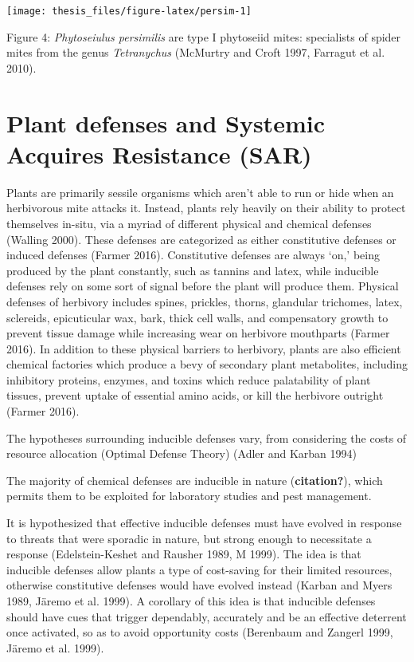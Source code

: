\documentclass[12pt,final,CPage]{ufthesis}
\begin{document}
{  \begin{center}\texttt{[image: thesis\_files/figure-latex/persim-1]} \end{center}

  Figure 4: \emph{Phytoseiulus persimilis} are type I phytoseiid mites: specialists of spider mites from the genus \emph{Tetranychus} (McMurtry and Croft 1997, Farragut et al. 2010).

  \hypertarget{sar-litrev}{%
  \section{Plant defenses and Systemic Acquires Resistance (SAR)}\label{sar-litrev}}

  Plants are primarily sessile organisms which aren't able to run or hide when an herbivorous mite attacks it. Instead, plants rely heavily on their ability to protect themselves in-situ, via a myriad of different physical and chemical defenses (Walling 2000). These defenses are categorized as either constitutive defenses or induced defenses (Farmer 2016). Constitutive defenses are always `on,' being produced by the plant constantly, such as tannins and latex, while inducible defenses rely on some sort of signal before the plant will produce them. Physical defenses of herbivory includes spines, prickles, thorns, glandular trichomes, latex, sclereids, epicuticular wax, bark, thick cell walls, and compensatory growth to prevent tissue damage while increasing wear on herbivore mouthparts (Farmer 2016). In addition to these physical barriers to herbivory, plants are also efficient chemical factories which produce a bevy of secondary plant metabolites, including inhibitory proteins, enzymes, and toxins which reduce palatability of plant tissues, prevent uptake of essential amino acids, or kill the herbivore outright (Farmer 2016).

  The hypotheses surrounding inducible defenses vary, from considering the costs of resource allocation (Optimal Defense Theory) (Adler and Karban 1994)

  The majority of chemical defenses are inducible in nature (\textbf{citation?}), which permits them to be exploited for laboratory studies and pest management.

  It is hypothesized that effective inducible defenses must have evolved in response to threats that were sporadic in nature, but strong enough to necessitate a response (Edelstein-Keshet and Rausher 1989, M 1999). The idea is that inducible defenses allow plants a type of cost-saving for their limited resources, otherwise constitutive defenses would have evolved instead (Karban and Myers 1989, Järemo et al. 1999). A corollary of this idea is that inducible defenses should have cues that trigger dependably, accurately and be an effective deterrent once activated, so as to avoid opportunity costs (Berenbaum and Zangerl 1999, Järemo et al. 1999).

}
\end{document}
